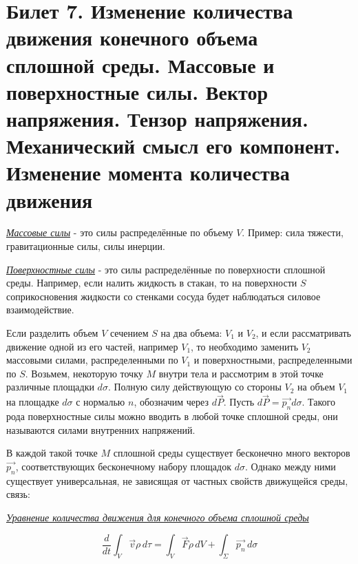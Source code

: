 \newpage
\section{Билет 7. Изменение количества движения конечного объема сплошной среды. Массовые и поверхностные силы. Вектор напряжения. Тензор напряжения. Механический смысл его компонент. Изменение момента количества движения}

\textit{\underline{Массовые силы}} - это силы распределённые по объему $V$. Пример: сила тяжести, гравитационные силы, силы инерции.

\textit{\underline{Поверхностные силы}} - это силы распределённые по поверхности сплошной среды. Например, если налить жидкость в стакан, то на поверхности $S$ соприкосновения жидкости со стенками сосуда будет наблюдаться силовое взаимодействие.

Если разделить объем $V$ сечением $S$ на два объема: $V_1$ и $V_2$, и если рассматривать движение одной из его частей, например $V_1$, то необходимо заменить $V_2$ массовыми силами, распределенными по $V_1$ и поверхностными, распределенными по $S$. Возьмем, некоторую точку $M$ внутри тела и рассмотрим в этой точке различные площадки $d\sigma$. Полную силу действующую со стороны $V_2$ на объем $V_1$ на площадке $d\sigma$ с нормалью $n$, обозначим через $d\vec{P}$. Пусть $d\vec{P} = \vec{p_n}d\sigma$. Такого рода поверхностные силы можно вводить в любой точке сплошной среды, они называются силами внутренних напряжений.

В каждой такой точке $M$ сплошной среды существует бесконечно много векторов $\vec{p_n}$, соответствующих бесконечному набору площадок $d\sigma$. Однако между ними существует универсальная, не зависящая от частных свойств движущейся среды, связь:

\begin{center}
  \textit{\underline{Уравнение количества движения для конечного объема сплошной среды}}
\end{center}
$$
  \frac{d}{dt}  \int_{V} \vec{v} \rho \,d\tau =  \int_{V} \vec{F} \rho \,dV  + \int_{\Sigma} \vec{p_n} \,d\sigma
$$

